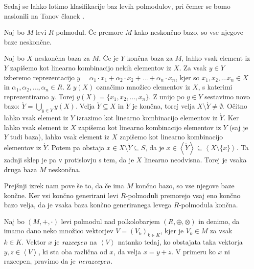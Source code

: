 \documentclass[mat1]{fmfdelo}
\newcommand{\pojem}[1]{\ensuremath{\emph{#1}}}
\newcommand{\Gen}[1]{\ensuremath{\left<{#1}\right>}}
\begin{document}
Sedaj se lahko lotimo klasifikacije baz levih polmodulov, pri čemer se bomo naslonili na Tanov članek \cite{bib:Tanbase}.

\begin{izrek}
	Naj bo $M$ levi $R$-polmodul. Če premore $M$ kako neskončno bazo, so vse njegove baze neskončne.
\end{izrek}
\begin{dokaz}
	Naj bo $X$ neskončna baza za $M$. Če je $Y$ končna baza za $M$, lahko vsak element iz $Y$ zapišemo kot linearno kombinacijo nekih elementov iz $X$. Za vsak $y\in Y$ izberemo reprezentacijo $y = \alpha_1\cdot x_1 + \alpha_2\cdot x_2 + \ldots + \alpha_n\cdot x_n$, kjer so $x_1, x_2, \ldots x_n \in X$ in $\alpha_1, \alpha_2, \ldots, \alpha_n \in R$. Z $y(X)$ označimo množico elementov iz $X$, s katerimi reprezentiramo $y$. Torej $y(X) = \{x_1, x_2, \ldots, x_n\}$. Z unijo po $y\in Y$ sestavimo novo bazo: $\acute{Y} = \bigcup_{y\in Y}y(X)$. Velja $\acute{Y} \subseteq X$ in $\acute{Y}$ je končna, torej velja $X\setminus\acute{Y}\neq\emptyset$. Očitno lahko vsak element iz $Y$ izrazimo kot linearno kombinacijo elementov iz $\acute{Y}$. Ker lahko vsak element iz $X$ zapišemo kot linearno kombinacijo elementov iz $Y$ (saj je $Y$ tudi baza), lahko vsak element iz $X$ zapišemo kot linearno kombinacijo elementov iz $\acute{Y}$. Potem pa obstaja $x\in X\setminus\acute{Y} \subseteq S$, da je $x\in \Gen{\acute{Y}}\subseteq\Gen{X\setminus\{x\}}$. Ta zadnji sklep je pa v protislovju s tem, da je $X$ linearno neodvisna. Torej je vsaka druga baza $M$ neskončna.
\end{dokaz}

\begin{opomba}
	Prejšnji izrek nam pove še to, da če ima $M$ končno bazo, so vse njegove baze končne. Ker vsi končno generirani levi $R$-polmoduli premorejo vsaj eno končno bazo velja, da je vsaka baza končno generiranega levega $R$-polmodula končna.
\end{opomba}



\begin{definicija}
	Naj bo $(M, +,\cdot)$ levi polmodul nad polkolobarjem $(R, \oplus, \otimes)$ in denimo, da imamo dano neko množico vektorjev $V = (V_k)_{k\in K}$, kjer je $V_k\in M$ za vsak $k\in K$. Vektor $x$ je \pojem{razcepen} na \Gen{V} natanko tedaj, ko obstajata taka vektorja $y, z\in \Gen{V}$, ki sta oba različna od $x$, da velja $x = y + z$. V primeru ko $x$ ni razcepen, pravimo da je \pojem{nerazcepen}.
\end{definicija}
\end{document}
